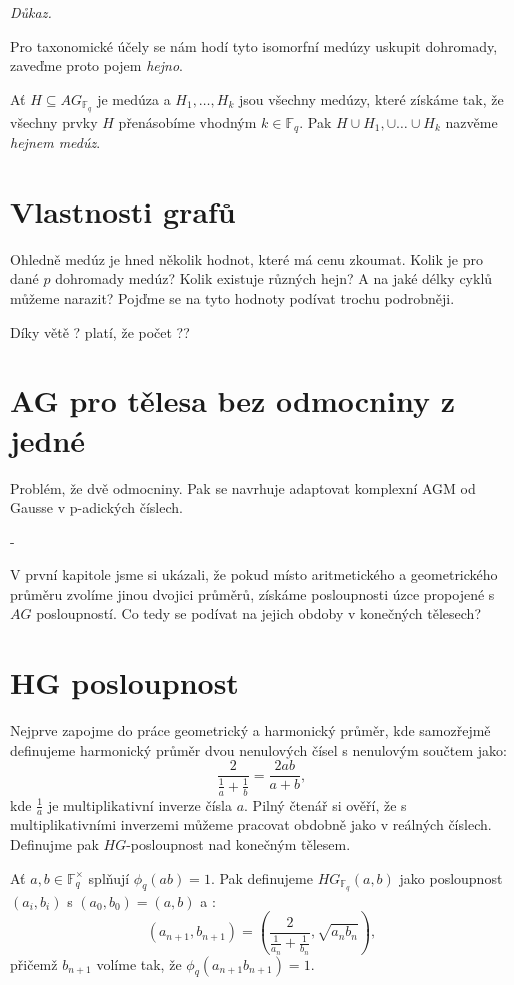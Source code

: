\documentclass[12pt]{report}
\begin{document}
\noindent \textit{Důkaz.}

Pro taxonomické účely se nám hodí tyto isomorfní medúzy uskupit dohromady, zaveďme proto pojem \textit{hejno}.
\begin{definice}
Ať $H \subseteq AG_{\mathbb{F}_q}$ je medúza a $H_1,\dots,H_k$ jsou všechny medúzy, které získáme tak, že všechny prvky $H$ přenásobíme vhodným $k \in \mathbb{F}_q$. Pak $H \cup H_1, \cup \dots \cup H_k$ nazvěme \textit{hejnem medúz}.
\end{definice}
 
 
\section{Vlastnosti grafů}

Ohledně medúz je hned několik hodnot, které má cenu zkoumat. Kolik je pro dané $p$ dohromady medúz? Kolik existuje různých hejn? A na jaké délky cyklů můžeme narazit? Pojďme se na tyto hodnoty podívat trochu podrobněji.

Díky větě ? platí, že počet ??



\section{AG pro tělesa bez odmocniny z jedné}


Problém, že dvě odmocniny. Pak se navrhuje adaptovat komplexní AGM od Gausse v p-adických číslech.

-

 
V první kapitole jsme si ukázali, že pokud místo aritmetického a geometrického průměru zvolíme jinou dvojici průměrů, získáme posloupnosti úzce propojené s $AG$ posloupností. Co tedy se podívat na jejich obdoby v konečných tělesech? 


\section{HG posloupnost}

Nejprve zapojme do práce geometrický a harmonický průměr, kde samozřejmě definujeme harmonický průměr dvou nenulových čísel s nenulovým součtem jako:
$$\frac{2}{\frac{1}{a}+\frac{1}{b}} = \frac{2ab}{a+b},$$
kde $\frac{1}{a}$ je multiplikativní inverze čísla $a$. Pilný čtenář si ověří, že s multiplikativními inverzemi můžeme pracovat obdobně jako v reálných číslech. Definujme pak $HG$-posloupnost nad konečným tělesem.


\begin{definice}
Ať $a,b \in \mathbb{F}_q ^{\times}$ splňují $\phi_q (ab) = 1$. Pak definujeme $HG_{\mathbb{F}_q}(a,b)$ jako posloupnost $(a_i,b_i)$ s $(a_0,b_0) = (a,b)$ a :
\begin{equation*}
\left(a_{n+1},b_{n+1} \right) = \left(\frac{2}{\frac{1}{a_n} + \frac{1}{b_n}}, \sqrt{a_n b_n} \right),
\end{equation*}
přičemž $b_{n+1}$ volíme tak, že $\phi_q (a_{n+1} b_{n+1}) = 1$.
\end{definice}
\end{document}
